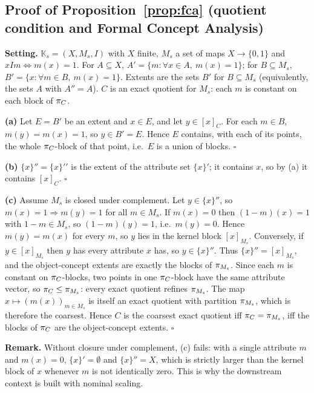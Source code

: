 \subsection{Proof of Proposition~\ref{prop:fca} (quotient condition and Formal Concept
Analysis)}
\label{proof:P5}
\textbf{Setting.} $\mathbb{K}_s=(X,M_s,I)$ with $X$ finite, $M_s$ a set of
maps $X\to\{0,1\}$ and $xIm\iff m(x)=1$. For $A\subseteq X$,
$A'=\{m:\forall x\in A,\ m(x)=1\}$; for $B\subseteq M_s$,
$B'=\{x:\forall m\in B,\ m(x)=1\}$. Extents are the sets $B'$ for
$B\subseteq M_s$ (equivalently, the sets $A$ with $A''=A$). $C$ is an exact
quotient for $M_s$: each $m$ is constant on each block of $\pi_C$.

\textbf{(a)} Let $E=B'$ be an extent and $x\in E$, and let $y\in[x]_C$. For
each $m\in B$, $m(y)=m(x)=1$, so $y\in B'=E$. Hence $E$ contains, with each of
its points, the whole $\pi_C$-block of that point, i.e.\ $E$ is a union of
blocks. \hfill$\square$

\textbf{(b)} $\{x\}''=\{x\}'{}'$ is the extent of the attribute set
$\{x\}'$; it contains $x$, so by (a) it contains $[x]_C$. \hfill$\square$

\textbf{(c)} Assume $M_s$ is closed under complement. Let $y\in\{x\}''$, so
$m(x)=1\Rightarrow m(y)=1$ for all $m\in M_s$. If $m(x)=0$ then
$(1-m)(x)=1$ with $1-m\in M_s$, so $(1-m)(y)=1$, i.e.\ $m(y)=0$. Hence
$m(y)=m(x)$ for every $m$, so $y$ lies in the kernel block $[x]_{M_s}$.
Conversely, if $y\in[x]_{M_s}$ then $y$ has every attribute $x$ has, so
$y\in\{x\}''$. Thus $\{x\}''=[x]_{M_s}$, and the object-concept extents are
exactly the blocks of $\pi_{M_s}$.
Since each $m$ is constant on $\pi_C$-blocks, two points in one
$\pi_C$-block have the same attribute vector, so $\pi_C\le\pi_{M_s}$:
every exact quotient refines $\pi_{M_s}$. The map
$x\mapsto(m(x))_{m\in M_s}$ is itself an exact quotient with partition
$\pi_{M_s}$, which is therefore the coarsest. Hence $C$ is the coarsest
exact quotient iff $\pi_C=\pi_{M_s}$, iff the blocks of $\pi_C$ are the
object-concept extents. \hfill$\square$

\textbf{Remark.} Without closure under complement, (c) fails: with a single
attribute $m$ and $m(x)=0$, $\{x\}'=\emptyset$ and $\{x\}''=X$, which is
strictly larger than the kernel block of $x$ whenever $m$ is not identically
zero. This is why the downstream context is built with nominal scaling.
